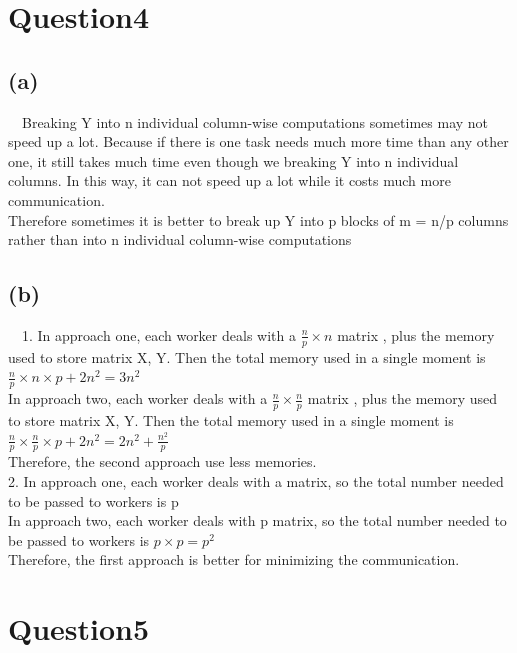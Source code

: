 \documentclass{article}\usepackage[]{graphicx}\usepackage[]{color}
\begin{document}
\section{Question4}
\subsection{(a)}
\quad \ \ Breaking Y into n individual column-wise computations sometimes may not speed up a lot. Because if there is one task needs much more time than any other one, it still takes much time even though we breaking Y into n individual columns. In this way, it can not speed up a lot while it costs much more communication. \\

Therefore sometimes it is better to break up Y into p blocks of m = n/p columns rather than into n individual column-wise computations

\subsection{(b)}
\quad \ \ 1. In approach one, each worker deals with a $\frac{n}{p}\times n$ matrix , plus the memory used to store matrix X, Y. Then the total memory used in a single moment is $\frac{n}{p}\times n\times p+2n^2=3n^2$ \\

In approach two, each worker deals with a $\frac{n}{p}\times \frac{n}{p}$ matrix , plus the memory used to store matrix X, Y. Then the total memory used in a single moment is $\frac{n}{p}\times \frac{n}{p}\times p+2n^2=2n^2+\frac{n^2}{p}$ \\

Therefore, the second approach use less memories.\\

2. In approach one, each worker deals with a matrix, so the total number needed to be passed to workers is p \\

In approach two, each worker deals with p matrix, so the total number needed to be passed to workers is $p\times p=p^2$ \\

Therefore, the first approach is better for minimizing the communication.

\section{Question5}
\end{document}
